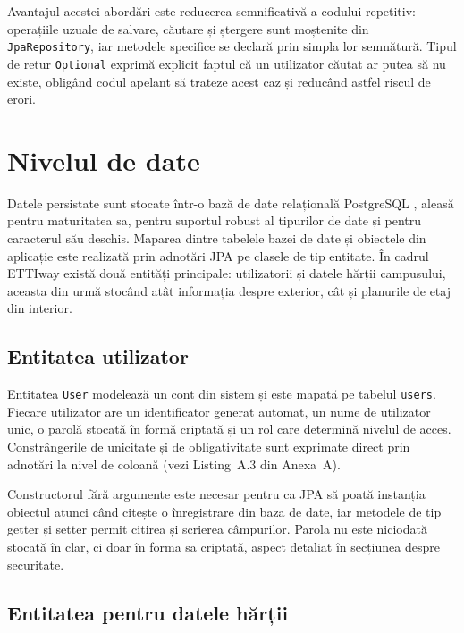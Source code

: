 Avantajul acestei abordări este reducerea semnificativă a codului repetitiv:
operațiile uzuale de salvare, căutare și ștergere sunt moștenite din
\texttt{JpaRepository}, iar metodele specifice se declară prin simpla lor
semnătură. Tipul de retur \texttt{Optional} exprimă explicit faptul că un
utilizator căutat ar putea să nu existe, obligând codul apelant să trateze
acest caz și reducând astfel riscul de erori.

\section{Nivelul de date}
\label{sec:date}

Datele persistate sunt stocate într-o bază de date relațională PostgreSQL
\cite{PostgreSQL}, aleasă pentru maturitatea sa, pentru suportul robust al
tipurilor de date și pentru caracterul său deschis. Maparea dintre tabelele
bazei de date și obiectele din aplicație este realizată prin adnotări JPA pe
clasele de tip entitate. În cadrul ETTIway există două entități principale:
utilizatorii și datele hărții campusului, aceasta din urmă stocând atât
informația despre exterior, cât și planurile de etaj din interior.

\subsection{Entitatea utilizator}
\label{subsec:user-entity}

Entitatea \texttt{User} modelează un cont din sistem și este mapată pe tabelul
\texttt{users}. Fiecare utilizator are un identificator generat automat, un
nume de utilizator unic, o parolă stocată în formă criptată și un rol care
determină nivelul de acces. Constrângerile de unicitate și de obligativitate
sunt exprimate direct prin adnotări la nivel de coloană (vezi Listing~A.3 din
Anexa~A).

Constructorul fără argumente este necesar pentru ca JPA să poată instanția
obiectul atunci când citește o înregistrare din baza de date, iar metodele de
tip getter și setter permit citirea și scrierea câmpurilor. Parola nu este
niciodată stocată în clar, ci doar în forma sa criptată, aspect detaliat în
secțiunea despre securitate.

\subsection{Entitatea pentru datele hărții}
\label{subsec:mapdata-entity}

